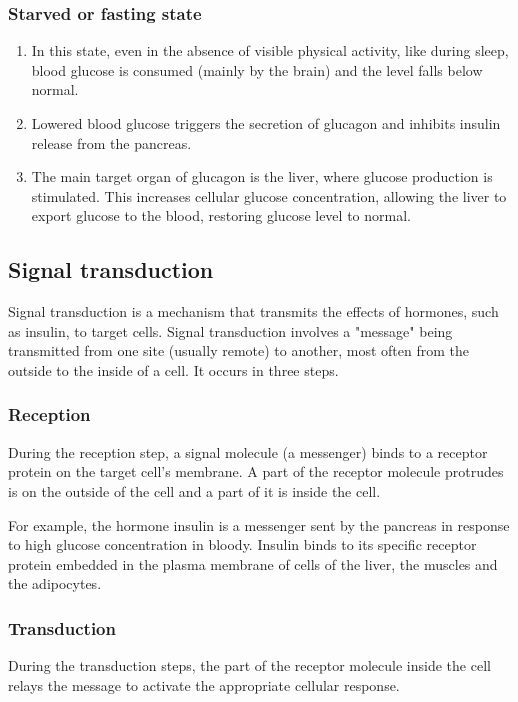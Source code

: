 \documentclass[11pt]{article}
\begin{document}
\subsubsection{Starved or fasting state}
\label{sec:org4111a16}
\begin{enumerate}
\item In this state, even in the absence of visible physical activity, like during sleep, blood glucose is consumed (mainly by the brain) and the level falls below normal.
\item Lowered blood glucose triggers the secretion of glucagon and inhibits insulin release from the pancreas.
\item The main target organ of glucagon is the liver, where glucose production is stimulated. This increases cellular glucose concentration, allowing the liver to export glucose to the blood, restoring glucose level to normal.
\end{enumerate}

\newpage
\subsection{Signal transduction}
\label{sec:orgb5e2bc7}
Signal transduction is a mechanism that transmits the effects of hormones, such as insulin, to target cells. Signal transduction involves a "message" being transmitted from one site (usually remote) to another, most often from the outside to the inside of a cell. It occurs in three steps.
\subsubsection{Reception}
\label{sec:org562240c}
During the reception step, a signal molecule (a messenger) binds to a receptor protein on the target cell's membrane. A part of the receptor molecule protrudes is on the outside of the cell and a part of it is inside the cell.


For example, the hormone insulin is a messenger sent by the pancreas in response to high glucose concentration in bloody. Insulin binds to its specific receptor protein embedded in the plasma membrane of cells of the liver, the muscles and the adipocytes.
\subsubsection{Transduction}
\label{sec:org8fe482f}
During the transduction steps, the part of the receptor molecule inside the cell relays the message to activate the appropriate cellular response.
\end{document}
